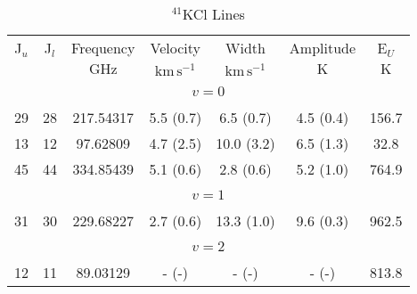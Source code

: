 \begin{table*}[htp]
\centering
\caption{$^{41}$KCl Lines}
\begin{tabular}{ccccccc}
\label{tab:41KCl_salt_lines}
 J$_u$ & J$_l$ & Frequency & Velocity & Width & Amplitude & E$_U$ \\
  &  & $\mathrm{GHz}$ & $\mathrm{km\,s^{-1}}$ & $\mathrm{km\,s^{-1}}$ & $\mathrm{K}$ & $\mathrm{K}$ \\
\hline
&\vspace{-0.75em}\\
\multicolumn{7}{c}{$v = 0$} \\
\vspace{-0.75em}\\
 29 & 28 & 217.54317 & 5.5 (0.7) & 6.5 (0.7) & 4.5 (0.4) & 156.7 \\
 13 & 12 & 97.62809 & 4.7 (2.5) & 10.0 (3.2) & 6.5 (1.3) & 32.8 \\
 45 & 44 & 334.85439 & 5.1 (0.6) & 2.8 (0.6) & 5.2 (1.0) & 764.9 \\
&\vspace{-0.75em}\\
\multicolumn{7}{c}{$v = 1$} \\
\vspace{-0.75em}\\
 31 & 30 & 229.68227 & 2.7 (0.6) & 13.3 (1.0) & 9.6 (0.3) & 962.5 \\
\hline
&\vspace{-0.75em}\\
\multicolumn{7}{c}{$v = 2$} \\
\vspace{-0.75em}\\
 12 & 11 & 89.03129 & - (-) & - (-) & - (-) & 813.8 \\
\end{tabular}

\par 
\end{table*}
